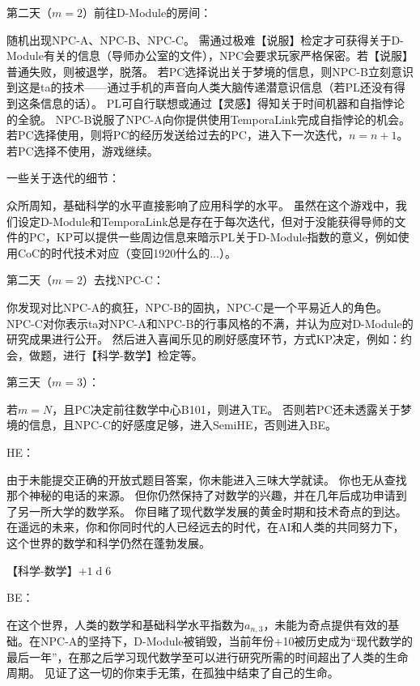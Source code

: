\documentclass[12pt]{report}
\begin{document}
\color{green}
第二天（$m=2$）前往D-Module的房间：

\color{red}
随机出现NPC-A、NPC-B、NPC-C。
\color{blue}
需通过极难【说服】检定才可获得关于D-Module有关的信息（导师办公室的文件），NPC会要求玩家严格保密。若【说服】普通失败，则被退学，脱落。
若PC选择说出关于梦境的信息，则NPC-B立刻意识到这是ta的技术——通过手机的声音向人类大脑传递潜意识信息\color{red}（若PL还没有得到这条信息的话）\color{black}。
\color{blue}
PL可自行联想或通过【灵感】得知关于时间机器和自指悖论的全貌。
\color{black}
NPC-B说服了NPC-A向你提供使用TemporaLink完成自指悖论的机会。
\color{red}
若PC选择使用，则将PC的经历发送给过去的PC，进入下一次迭代，$n=n+1$。
若PC选择不使用，游戏继续。

\color{green}
一些关于迭代的细节：

\color{red}
众所周知，基础科学的水平直接影响了应用科学的水平。
虽然在这个游戏中，我们设定D-Module和TemporaLink总是存在于每次迭代，但对于没能获得导师的文件的PC，KP可以提供一些周边信息来暗示PL关于D-Module指数的意义，例如使用CoC的时代技术对应（变回1920什么的...）。

\color{green}
第二天（$m=2$）去找NPC-C：

\color{black}
你发现对比NPC-A的疯狂，NPC-B的固执，NPC-C是一个平易近人的角色。
NPC-C对你表示ta对NPC-A和NPC-B的行事风格的不满，并认为应对D-Module的研究成果进行公开。
\color{red}
然后进入喜闻乐见的刷好感度环节，方式KP决定，例如：约会，做题，进行【科学-数学】检定等。

\color{green}
第三天（$m=3$）：

\color{red}
若$m=N$，且PC决定前往数学中心B101，则进入TE。
否则若PC还未透露关于梦境的信息，且NPC-C的好感度足够，进入SemiHE，否则进入BE。

\color{green}
HE：

\color{black}
由于未能提交正确的开放式题目答案，你未能进入三味大学就读。
你也无从查找那个神秘的电话的来源。
但你仍然保持了对数学的兴趣，并在几年后成功申请到了另一所大学的数学系。
你目睹了现代数学发展的黄金时期和技术奇点的到达。
在遥远的未来，你和你同时代的人已经远去的时代，在AI和人类的共同努力下，这个世界的数学和科学仍然在蓬勃发展。

\color{purple}【科学-数学】$+1\operatorname{d}6$

\color{green}
BE：

\color{black}
在这个世界，人类的数学和基础科学水平指数为$a_{n,3}$，未能为奇点提供有效的基础。在NPC-A的坚持下，D-Module被销毁，{当前年份+10}被历史成为“现代数学的最后一年”，在那之后学习现代数学至可以进行研究所需的时间超出了人类的生命周期。
见证了这一切的你束手无策，在孤独中结束了自己的生命。
\end{document}
